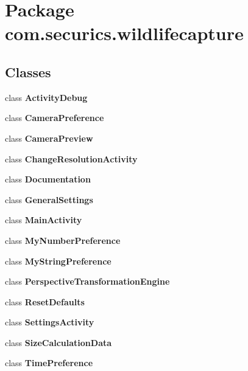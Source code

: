 \section{Package com.\+securics.\+wildlifecapture}
\label{namespacecom_1_1securics_1_1wildlifecapture}
\subsection*{Classes}
\begin{DoxyCompactItemize}
\item 
class {\bf Activity\+Debug}
\item 
class {\bf Camera\+Preference}
\item 
class {\bf Camera\+Preview}
\item 
class {\bf Change\+Resolution\+Activity}
\item 
class {\bf Documentation}
\item 
class {\bf General\+Settings}
\item 
class {\bf Main\+Activity}
\item 
class {\bf My\+Number\+Preference}
\item 
class {\bf My\+String\+Preference}
\item 
class {\bf Perspective\+Transformation\+Engine}
\item 
class {\bf Reset\+Defaults}
\item 
class {\bf Settings\+Activity}
\item 
class {\bf Size\+Calculation\+Data}
\item 
class {\bf Time\+Preference}
\end{DoxyCompactItemize}
